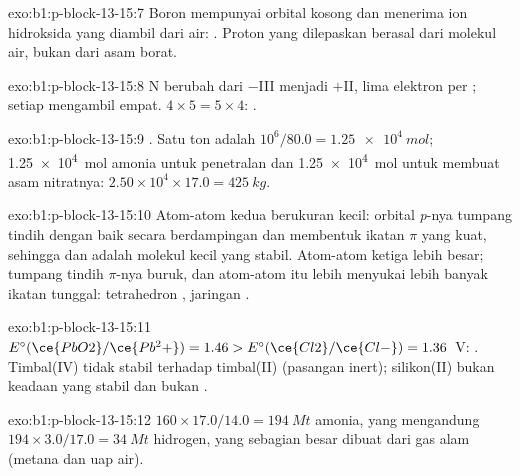 \begin{solution}{exo:b1:p-block-13-15:7}
Boron mempunyai orbital kosong dan menerima  ion
hidroksida yang diambil dari air: .
Proton yang dilepaskan berasal dari molekul air, bukan dari asam borat.
\end{solution}

\begin{solution}{exo:b1:p-block-13-15:8}
N berubah dari $-$III menjadi $+$II, lima elektron per ; setiap
 mengambil empat. $4 \times 5 = 5 \times 4$: .
\end{solution}

\begin{solution}{exo:b1:p-block-13-15:9}
. Satu ton adalah $10^6/80.0 = \qty{1.25e4}{mol}$;
\qty{1.25e4}{mol} amonia untuk penetralan dan \qty{1.25e4}{mol} untuk
membuat asam nitratnya: $2.50 \times 10^4 \times 17.0 = \qty{425}{kg}$.
\end{solution}

\begin{solution}{exo:b1:p-block-13-15:10}
Atom-atom  kedua berukuran kecil: orbital \textit{p}-nya tumpang
tindih dengan baik secara berdampingan dan membentuk ikatan $\pi$ yang
kuat, sehingga  dan  adalah molekul kecil yang stabil.
Atom-atom  ketiga lebih besar; tumpang tindih $\pi$-nya buruk, dan
atom-atom itu lebih menyukai lebih banyak ikatan tunggal: tetrahedron
, jaringan .
\end{solution}

\begin{solution}{exo:b1:p-block-13-15:11}
$E^\circ(\ce{PbO2}/\ce{Pb^2+}) = 1.46 > E^\circ(\ce{Cl2}/\ce{Cl-}) = 1.36$~V:
. Timbal(IV) tidak stabil
terhadap timbal(II) (pasangan inert); silikon(II) bukan keadaan yang
stabil dan  bukan .
\end{solution}

\begin{solution}{exo:b1:p-block-13-15:12}
$160 \times 17.0/14.0 = \qty{194}{Mt}$ amonia, yang mengandung $194 \times
3.0/17.0 = \qty{34}{Mt}$ hidrogen, yang sebagian besar dibuat dari gas alam
(metana dan uap air).
\end{solution}

